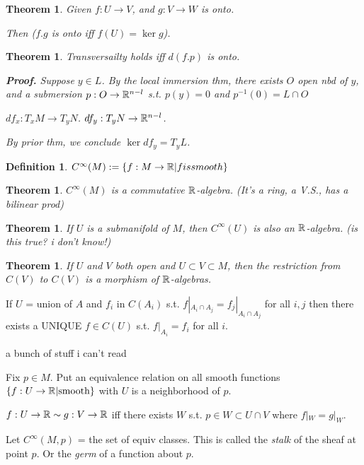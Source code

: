 \documentclass[11pt,leqno,oneside]{amsart}
\newenvironment{dateenv}{
	\vspace{1em}
}{
	\vspace{1em}
}
\newcommand{\de}{\emph}
\newcommand{\mydate}[4]{
	\newdate{#1}{#2}{#3}{#4}
	\begin{dateenv}
		\hfill\displaydate{#1}
	\end{dateenv}
}
\theoremstyle{mystyle} \newtheorem{thrm}[thm]{Theorem}
\theoremstyle{mystyle} \newtheorem{defi}[thm]{Definition}
\begin{document}
\begin{thrm}
	Given $f : U \to V$, and
	$g : V \to W$ is onto.

	Then ($f.g$ is onto iff $f(U) = \ker g$).
\end{thrm}

\begin{thrm}
	Transversailty holds iff $d(f.p)$ is onto.

	\textbf{Proof.}
	Suppose $y \in L$.
	By the local immersion thm,
	there exists $O$ open nbd of $y$, and a submersion $p : O \to {\mathbb R}^{n-l}$
	s.t. $p(y) = 0$ and $p^{-1}(0) = L \cap O$

	$df_x : T_xM \to T_yN$.
	$df_y : T_yN \to {\mathbb R}^{n-l}$.

	By prior thm, we conclude $\ker df_y = T_yL$.
\end{thrm}

\mydate{d4}{5}{10}{2016}

\begin{defi}
	$C^\infty(M) := \{ f:M \to {\mathbb R} | f is smooth \}$
\end{defi}
\begin{thrm}
	$C^\infty(M)$ is a commutative ${\mathbb R}$-algebra. (It's a ring, a V.S., has a bilinear prod)
\end{thrm}
\begin{thrm}
	If $U$ is a submanifold of $M$, then $C^\infty(U)$ is also an ${\mathbb R}$-algebra.
	(is this true?  i don't know!)
\end{thrm}
\begin{thrm}
	If $U$ and $V$ both open and $U \subset V \subset M$, then
	the restriction from $C(V)$ to $C(V)$ is a morphism of ${\mathbb R}$-algebras.
\end{thrm}
\begin{prop}
	If $U$ = union of $A$
	and $f_i$ in $C(A_i)$ s.t. $f|_{A_i \cap A_j} = f_j|_{A_i \cap A_j}$ for all $i, j$
	then there exists a UNIQUE $f \in C(U)$ s.t. $f|_{A_i} = f_i$ for all $i$.
\end{prop}

a bunch of stuff i can't read

Fix $p \in M$.
Put an equivalence relation on all smooth functions $\{ f : U \to {\mathbb R} | \text{smooth}\}$
with $U$ is a neighborhood of $p$.

$f:U \to {\mathbb R} \sim g:V \to {\mathbb R}$
iff
there exists $W$ s.t. $p \in W \subset U \cap V$ where $f|_W = g|_W$.

Let $C^\infty(M,p)$ = the set of equiv classes.  This is called the \de{stalk} of the sheaf at point $p$.  Or the \de{germ} of a function about $p$.
\end{document}
